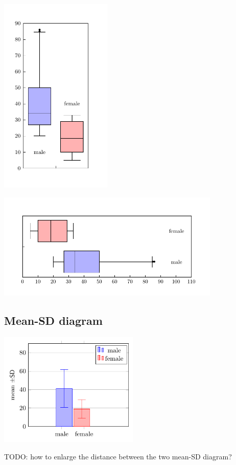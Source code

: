 \documentclass[a4paper]{article}
\begin{document}
	\begin{center}
		\includegraphics[width=0.4\textwidth]{boxplot_vertical}
		
		\includegraphics[width=0.8\textwidth]{boxplot_horizontal}
	\end{center}
	
	\subsection{Mean-SD diagram}
		\begin{center}
		\includegraphics[width=0.5\textwidth]{mean-SD}
		
		TODO: how to enlarge the distance between the two mean-SD diagram?
	\end{center}
	
\end{document}
